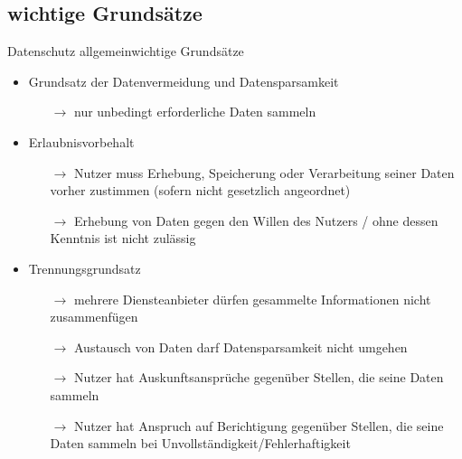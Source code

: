 \documentclass[9pt]{beamer}
\begin{document}
        \subsection{wichtige Grundsätze}
            \begin{frame}{Datenschutz allgemein}{wichtige Grundsätze}
                \begin{itemize}
                    \item Grundsatz der Datenvermeidung und Datensparsamkeit\\
                    \begin{itemize}
                        \item[$\rightarrow$] nur unbedingt erforderliche Daten sammeln
                    \end{itemize}
                    \item Erlaubnisvorbehalt
                    \begin{itemize}
                        \item[$\rightarrow$] Nutzer muss Erhebung, Speicherung oder Verarbeitung seiner Daten
                        vorher zustimmen (sofern nicht gesetzlich angeordnet)
                        \item[$\rightarrow$] Erhebung von Daten gegen den Willen des Nutzers / ohne dessen Kenntnis ist nicht zulässig
                    \end{itemize}
                    \item Trennungsgrundsatz
                        \begin{itemize}
                            \item[$\rightarrow$] mehrere Diensteanbieter dürfen gesammelte Informationen nicht zusammenfügen
                            \item[$\rightarrow$] Austausch von Daten darf Datensparsamkeit nicht umgehen
                            \item[$\rightarrow$] Nutzer hat Auskunftsansprüche gegenüber Stellen, die seine Daten sammeln
                            \item[$\rightarrow$] Nutzer hat Anspruch auf Berichtigung gegenüber Stellen, die seine Daten sammeln bei Unvollständigkeit/Fehlerhaftigkeit
                        \end{itemize}
                \end{itemize}
            \end{frame}
\end{document}
